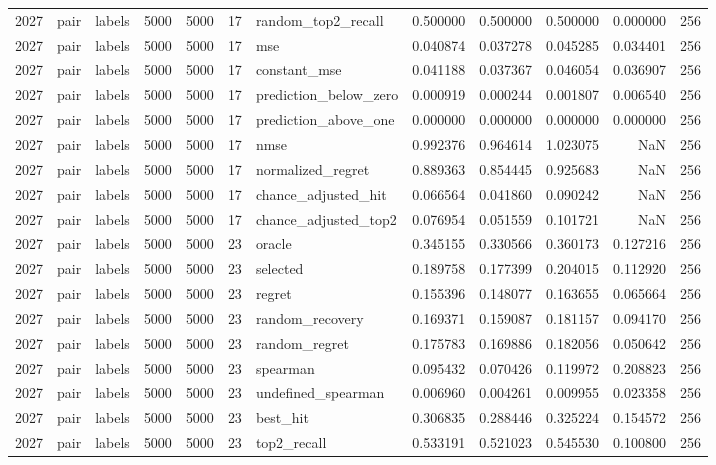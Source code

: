 \begin{tabular}{rllrrrlrrrrr}
2027 & pair & labels & 5000 & 5000 & 17 & random_top2_recall & 0.500000 & 0.500000 & 0.500000 & 0.000000 & 256 \\
2027 & pair & labels & 5000 & 5000 & 17 & mse & 0.040874 & 0.037278 & 0.045285 & 0.034401 & 256 \\
2027 & pair & labels & 5000 & 5000 & 17 & constant_mse & 0.041188 & 0.037367 & 0.046054 & 0.036907 & 256 \\
2027 & pair & labels & 5000 & 5000 & 17 & prediction_below_zero & 0.000919 & 0.000244 & 0.001807 & 0.006540 & 256 \\
2027 & pair & labels & 5000 & 5000 & 17 & prediction_above_one & 0.000000 & 0.000000 & 0.000000 & 0.000000 & 256 \\
2027 & pair & labels & 5000 & 5000 & 17 & nmse & 0.992376 & 0.964614 & 1.023075 & NaN & 256 \\
2027 & pair & labels & 5000 & 5000 & 17 & normalized_regret & 0.889363 & 0.854445 & 0.925683 & NaN & 256 \\
2027 & pair & labels & 5000 & 5000 & 17 & chance_adjusted_hit & 0.066564 & 0.041860 & 0.090242 & NaN & 256 \\
2027 & pair & labels & 5000 & 5000 & 17 & chance_adjusted_top2 & 0.076954 & 0.051559 & 0.101721 & NaN & 256 \\
2027 & pair & labels & 5000 & 5000 & 23 & oracle & 0.345155 & 0.330566 & 0.360173 & 0.127216 & 256 \\
2027 & pair & labels & 5000 & 5000 & 23 & selected & 0.189758 & 0.177399 & 0.204015 & 0.112920 & 256 \\
2027 & pair & labels & 5000 & 5000 & 23 & regret & 0.155396 & 0.148077 & 0.163655 & 0.065664 & 256 \\
2027 & pair & labels & 5000 & 5000 & 23 & random_recovery & 0.169371 & 0.159087 & 0.181157 & 0.094170 & 256 \\
2027 & pair & labels & 5000 & 5000 & 23 & random_regret & 0.175783 & 0.169886 & 0.182056 & 0.050642 & 256 \\
2027 & pair & labels & 5000 & 5000 & 23 & spearman & 0.095432 & 0.070426 & 0.119972 & 0.208823 & 256 \\
2027 & pair & labels & 5000 & 5000 & 23 & undefined_spearman & 0.006960 & 0.004261 & 0.009955 & 0.023358 & 256 \\
2027 & pair & labels & 5000 & 5000 & 23 & best_hit & 0.306835 & 0.288446 & 0.325224 & 0.154572 & 256 \\
2027 & pair & labels & 5000 & 5000 & 23 & top2_recall & 0.533191 & 0.521023 & 0.545530 & 0.100800 & 256 \\

\end{tabular}
